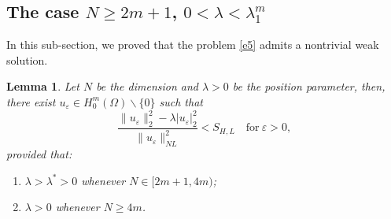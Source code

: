 \documentclass[reqno]{amsart}
\newtheorem{lemma}[theorem]{Lemma}
\newcommand{\la} {\lambda}
\newcommand{\eps}{\varepsilon}
\newcommand{\Om}{\Omega}
\newcommand{\noi} {  \noindent}
\numberwithin{theorem}{section} \numberwithin{equation}{section}
\begin{document}
\subsection{\bf{The case \texorpdfstring{$N \geq 2m+1$, $0<{\la}<{\la}^m_1$}{N >= 2m+1, 0<lambda<lambda^m_1}{}}}
\noi In this sub-section, we proved that the problem \eqref{e5} admits a nontrivial weak solution.
\begin{lemma}\label{l18}
Let $N$ be the dimension and $\la>0$ be the position parameter, then, there exist $u_{\eps} \in H_0^m(\Om) \backslash\{0\}$ such that
\[\frac{\|u_{\eps}\|_2^2-\la|u_{\eps}|_2^2}{\|u_{\eps}\|_{N L}^2}<S_{H, L} \quad \text{for}  \ {\eps>0},\] provided that:
\begin{enumerate}
\item $\la>\la^*>0$ whenever $N \in[2m+1, 4m)$;
\item  $\la>0$ whenever $N\geq4m$.
\end{enumerate}
\end{lemma}
\end{document}
